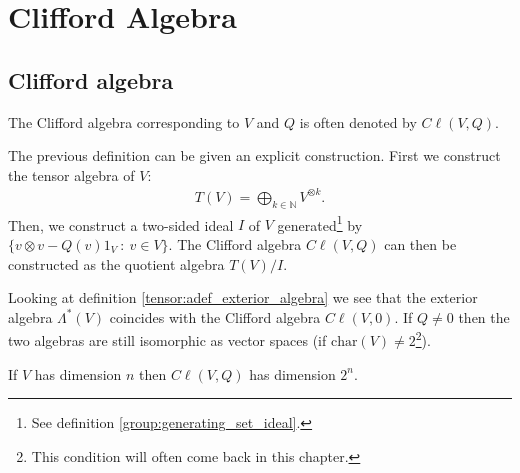 \chapter{Clifford Algebra}

\section{Clifford algebra}

    \begin{notation}
        The Clifford algebra corresponding to $V$ and $Q$ is often denoted by $C\ell(V, Q)$.
    \end{notation}

    \begin{construct}
        The previous definition can be given an explicit construction. First we construct the tensor algebra of $V$:
        \begin{gather}
            T(V) = \bigoplus_{k\in\mathbb{N}}V^{\otimes k}.
        \end{gather}
        Then, we construct a two-sided ideal $I$ of $V$ generated\footnote{See definition \ref{group:generating_set_ideal}.} by $\{v\otimes v - Q(v)1_V\ :\ v\in V\}$. The Clifford algebra $C\ell(V, Q)$ can then be constructed as the quotient algebra $T(V)/I$.
    \end{construct}

    \begin{remark}
        Looking at definition \ref{tensor:adef_exterior_algebra} we see that the exterior algebra $\Lambda^*(V)$ coincides with the Clifford algebra $C\ell(V, 0)$. If $Q\neq0$ then the two algebras are still isomorphic as vector spaces (if $\text{char}(V)\neq2$\footnote{This condition will often come back in this chapter.}).
    \end{remark}

    \begin{property}[Dimension]
        If $V$ has dimension $n$ then $C\ell(V, Q)$ has dimension $2^n$.
    \end{property}


